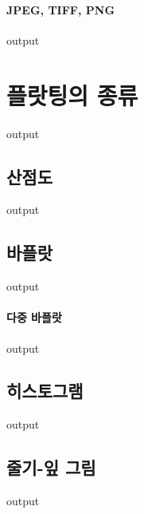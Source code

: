 \paragraph{JPEG, TIFF, PNG}
\begin{Schunk}
\begin{Soutput}
output
\end{Soutput}
\end{Schunk}

\section{플랏팅의 종류}
\begin{Schunk}
\begin{Soutput}
output
\end{Soutput}
\end{Schunk}

\subsection{산점도}
\begin{Schunk}
\begin{Soutput}
output
\end{Soutput}
\end{Schunk}
\subsection{바플랏}
\begin{Schunk}
\begin{Soutput}
output
\end{Soutput}
\end{Schunk}
\paragraph{다중 바플랏}
\begin{Schunk}
\begin{Soutput}
output
\end{Soutput}
\end{Schunk}
\subsection{히스토그램}
\begin{Schunk}
\begin{Soutput}
output
\end{Soutput}
\end{Schunk}
\subsection{줄기-잎 그림}
\begin{Schunk}
\begin{Soutput}
output
\end{Soutput}
\end{Schunk}
